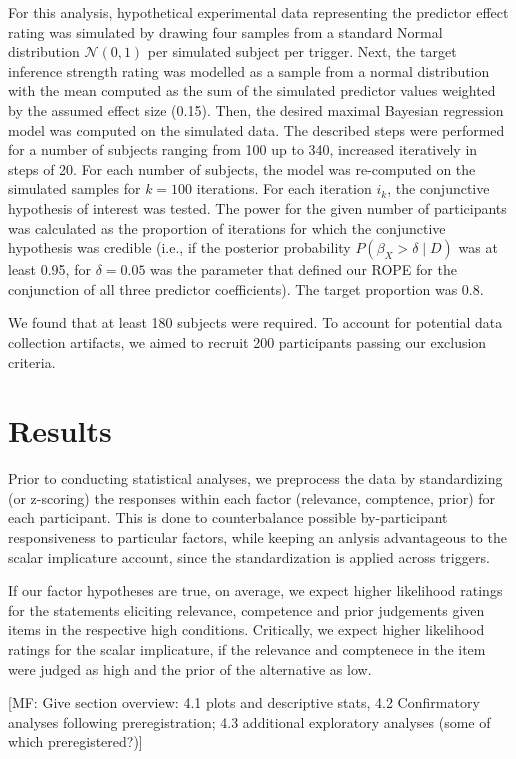 \documentclass{sp}
\newcommand{\mf}[1]{\textcolor{BurntOrange}{[MF: #1]}}
\begin{document}
For this analysis, hypothetical experimental data representing the predictor effect rating was simulated by drawing four samples from a standard Normal distribution $\mathcal{N}(0,1)$ per simulated subject per trigger. Next, the target inference strength rating was modelled as a sample from a normal distribution with the mean computed as the sum of the simulated predictor values weighted by the assumed effect size (0.15). Then, the desired maximal Bayesian regression model was computed on the simulated data. The described steps were performed for a number of subjects ranging from 100 up to 340, increased iteratively in steps of 20. For each number of subjects, the model was re-computed on the simulated samples for $k=100$ iterations. For each iteration $i_k$, the conjunctive hypothesis of interest was tested. 
The power for the given number of participants was calculated as the proportion of iterations for which the conjunctive hypothesis was credible (i.e., if the posterior probability $P(\beta_X > \delta \mid D)$ was at least 0.95, for $\delta = 0.05$ was the parameter that defined our ROPE for the conjunction of all three predictor coefficients). The target proportion was 0.8.

We found that at least 180 subjects were required. To account for potential data collection artifacts, we aimed to recruit 200 participants passing our exclusion criteria.

\section{Results}
Prior to conducting statistical analyses, we preprocess the data by standardizing (or z-scoring) the responses within each factor (relevance, comptence, prior) for each participant. This is done to counterbalance possible by-participant responsiveness to particular factors, while keeping an anlysis advantageous to the scalar implicature account, since the standardization is applied across triggers. 

If our factor hypotheses are true, on average, we expect higher likelihood ratings for the statements eliciting relevance, competence and prior judgements given items in the respective high conditions. Critically, we expect higher likelihood ratings for the scalar implicature, if the relevance and comptenece in the item were judged as high and the prior of the alternative as low.

\mf{Give section overview: 4.1 plots and descriptive stats, 4.2 Confirmatory analyses following preregistration; 4.3 additional exploratory analyses (some of which preregistered?)}
\end{document}

